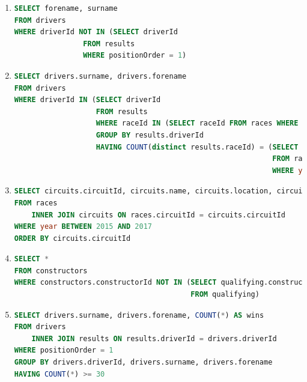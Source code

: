 \documentclass{db-practice}
\begin{document}
\begin{enumerate}
\item
\begin{lstlisting}[language=SQL]
SELECT forename, surname
FROM drivers
WHERE driverId NOT IN (SELECT driverId
                FROM results
                WHERE positionOrder = 1)
\end{lstlisting}
         
\item
\begin{lstlisting}[language=SQL]
SELECT drivers.surname, drivers.forename
FROM drivers
WHERE driverId IN (SELECT driverId
                   FROM results
                   WHERE raceId IN (SELECT raceId FROM races WHERE year=2017)
                   GROUP BY results.driverId
                   HAVING COUNT(distinct results.raceId) = (SELECT COUNT(*)
                                                            FROM races
                                                            WHERE year=2017))
\end{lstlisting}

\item
\begin{lstlisting}[language=SQL]
SELECT circuits.circuitId, circuits.name, circuits.location, circuits.country, year
FROM races 
    INNER JOIN circuits ON races.circuitId = circuits.circuitId
WHERE year BETWEEN 2015 AND 2017
ORDER BY circuits.circuitId
\end{lstlisting}

\item
\begin{lstlisting}[language=SQL]
SELECT *
FROM constructors
WHERE constructors.constructorId NOT IN (SELECT qualifying.constructorId 
                                         FROM qualifying)  
\end{lstlisting}
        
\item
\begin{lstlisting}[language=SQL]
SELECT drivers.surname, drivers.forename, COUNT(*) AS wins
FROM drivers
    INNER JOIN results ON results.driverId = drivers.driverId
WHERE positionOrder = 1
GROUP BY drivers.driverId, drivers.surname, drivers.forename
HAVING COUNT(*) >= 30
\end{lstlisting}


\end{enumerate}
\end{document}
